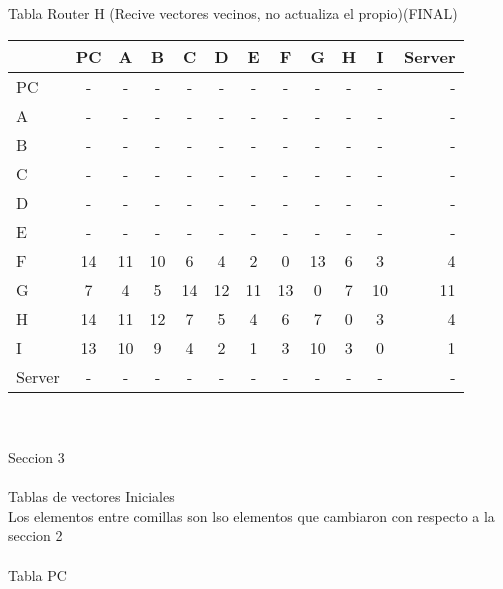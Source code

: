 \documentclass{article}
\begin{document}
\\
\\
Tabla Router H (Recive vectores vecinos, no actualiza el propio)(FINAL) \\
\begin{tabular}{l*{10}{c}r}
              & PC & A & B & C & D & E & F & G & H & I & Server \\
\hline
PC             & - & - & - & - & - & - & - & - & - & - & - \\
A              & - & - & - & - & - & - & - & - & - & - & - \\
B              & - & - & - & - & - & - & - & - & - & - & - \\
C              & - & - & - & - & - & - & - & - & - & - & - \\
D              & - & - & - & - & - & - & - & - & - & - & - \\
E              & - & - & - & - & - & - & - & - & - & - & - \\
F              & 14 & 11 & 10 & 6 & 4 & 2 & 0 & 13 & 6 & 3 & 4\\
G              & 7 & 4 & 5 & 14 & 12 & 11 & 13 & 0 & 7 & 10 & 11\\
H              & 14 & 11 & 12 & 7 & 5 & 4 & 6 & 7 & 0 & 3 & 4\\
I              & 13 & 10 & 9 & 4 & 2 & 1 & 3 & 10 & 3 & 0 & 1\\
Server         & - & - & - & - & - & - & - & - & - & - & - \\

\end{tabular}
\\
\\
Seccion 3 
\\
\\
\subitem Tablas de vectores Iniciales\\
Los elementos entre comillas son lso elementos que cambiaron con respecto a la seccion 2\\
\\
Tabla PC\\
\end{document}
